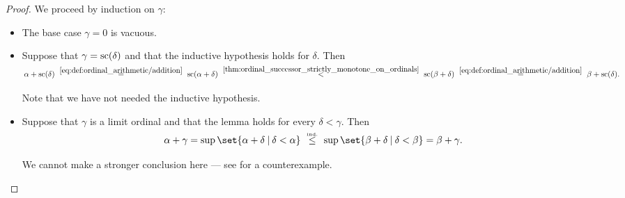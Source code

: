 \begin{proof}
   We proceed by induction on \( \gamma \):
  \begin{itemize}
    \item The base case \( \gamma = 0 \) is vacuous.
    \item Suppose that \( \gamma = \op{sc}(\delta) \) and that the inductive hypothesis holds for \( \delta \). Then
    \begin{equation*}
      \alpha + \op{sc}(\delta)
      \reloset {\eqref{eq:def:ordinal_arithmetic/addition}} =
      \op{sc}(\alpha + \delta)
      \reloset {\ref{thm:ordinal_successor_strictly_monotone_on_ordinals}} <
      \op{sc}(\beta + \delta)
      \reloset {\eqref{eq:def:ordinal_arithmetic/addition}} =
      \beta + \op{sc}(\delta).
    \end{equation*}

    Note that we have not needed the inductive hypothesis.

    \item Suppose that \( \gamma \) is a limit ordinal and that the lemma holds for every \( \delta < \gamma \). Then
    \begin{equation*}
      \alpha + \gamma
      =
      \sup\set{ \alpha + \delta \given \delta < \alpha }
      \reloset {\T{ind.}} \leq
      \sup\set{ \beta + \delta \given \delta < \beta }
      =
      \beta + \gamma.
    \end{equation*}

    We cannot make a stronger conclusion here --- see  for a counterexample.
  \end{itemize}
\end{proof}

